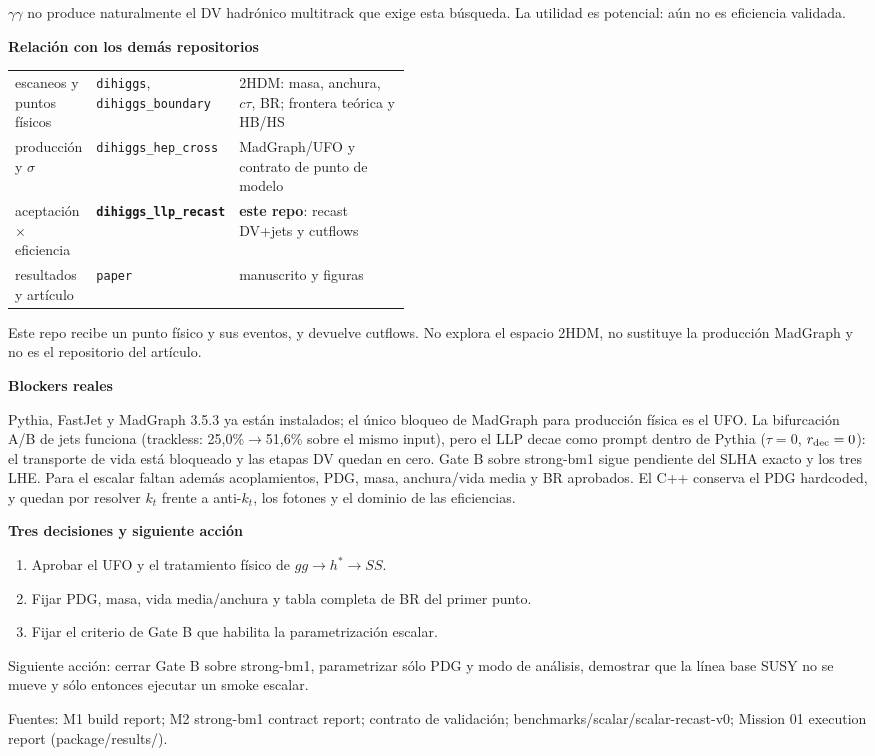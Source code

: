 \documentclass[9pt,a4paper]{article}
\newcommand{\head}[1]{\vspace{0.35em}\textbf{\large #1}\par\vspace{0.1em}}
\begin{document}
$\gamma\gamma$ no produce naturalmente el DV hadrónico multitrack que exige esta búsqueda. La utilidad es potencial: aún no es eficiencia validada.

\head{Relación con los demás repositorios}
\begin{tabular}{@{}llp{0.46\linewidth}@{}}
\toprule
escaneos y puntos físicos & \texttt{dihiggs}, \texttt{dihiggs\_boundary} & 2HDM: masa, anchura, $c\tau$, BR; frontera teórica y HB/HS\\
producción y $\sigma$ & \texttt{dihiggs\_hep\_cross} & MadGraph/UFO y contrato de punto de modelo\\
aceptación $\times$ eficiencia & \textbf{\texttt{dihiggs\_llp\_recast}} & \textbf{este repo}: recast DV+jets y cutflows\\
resultados y artículo & \texttt{paper} & manuscrito y figuras\\
\bottomrule
\end{tabular}

Este repo recibe un punto físico y sus eventos, y devuelve cutflows. No explora el espacio 2HDM, no sustituye la producción MadGraph y no es el repositorio del artículo.

\head{Blockers reales}
Pythia, FastJet y MadGraph 3.5.3 ya están instalados; el único bloqueo de MadGraph para producción física es el UFO. La bifurcación A/B de jets funciona (trackless: 25,0\%$\to$51,6\% sobre el mismo input), pero el LLP decae como prompt dentro de Pythia ($\tau=0$, $r_{\rm dec}=0$): el transporte de vida está bloqueado y las etapas DV quedan en cero. Gate B sobre strong-bm1 sigue pendiente del SLHA exacto y los tres LHE. Para el escalar faltan además acoplamientos, PDG, masa, anchura/vida media y BR aprobados. El C++ conserva el PDG hardcoded, y quedan por resolver $k_t$ frente a anti-$k_t$, los fotones y el dominio de las eficiencias.

\head{Tres decisiones y siguiente acción}
\begin{enumerate}
\item Aprobar el UFO y el tratamiento físico de $gg\to h^*\to SS$.
\item Fijar PDG, masa, vida media/anchura y tabla completa de BR del primer punto.
\item Fijar el criterio de Gate B que habilita la parametrización escalar.
\end{enumerate}
Siguiente acción: cerrar Gate B sobre strong-bm1, parametrizar sólo PDG y modo de análisis, demostrar que la línea base SUSY no se mueve y sólo entonces ejecutar un smoke escalar.

{\tiny Fuentes: M1 build report; M2 strong-bm1 contract report; contrato de validación; benchmarks/scalar/scalar-recast-v0; Mission 01 execution report (package/results/).}
\end{document}
